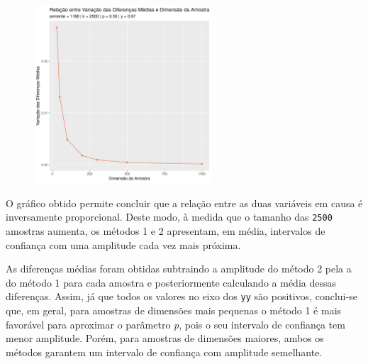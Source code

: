 \documentclass[12pt,a4paper]{article}
\begin{document}
\quad

\setlength\intextsep{0pt}
\begin{figure}
  \includegraphics[width = 0.59\textwidth]{./ex09.png}
\end{figure}

O gráfico obtido permite concluir que a relação entre as duas variáveis em causa é inversamente proporcional.
Deste modo, à medida que o tamanho das \texttt{2500} amostras aumenta, os métodos 1 e 2 apresentam, em média, intervalos de confiança com uma amplitude cada vez mais próxima.

As diferenças médias foram obtidas subtraindo a amplitude do método 2 pela a do método 1 para cada amostra e posteriormente calculando a média dessas diferenças.
Assim, já que todos os valores no eixo dos \texttt{yy} são positivos, conclui-se que, em geral, para amostras de dimensões mais pequenas o método 1 é mais favorável para aproximar o parâmetro \textit{p}, pois o seu intervalo de confiança tem menor amplitude.
Porém, para amostras de dimensões maiores, ambos os métodos garantem um intervalo de confiança com amplitude semelhante.
\end{document}
